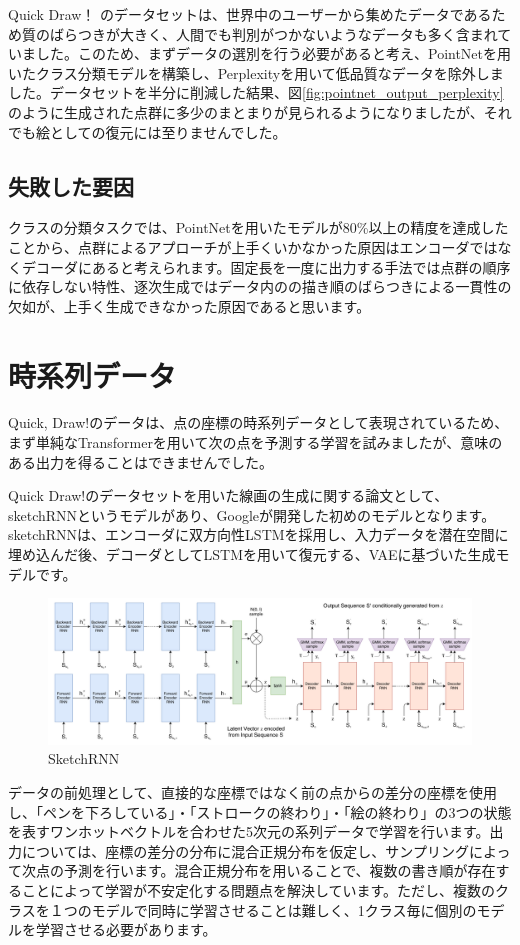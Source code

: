 Quick Draw！\cite{quickdraw} のデータセットは、世界中のユーザーから集めたデータであるため質のばらつきが大きく、人間でも判別がつかないようなデータも多く含まれていました。このため、まずデータの選別を行う必要があると考え、PointNet\cite{pointnet}を用いたクラス分類モデルを構築し、Perplexityを用いて低品質なデータを除外しました。データセットを半分に削減した結果、図\ref{fig:pointnet_output_perplexity}のように生成された点群に多少のまとまりが見られるようになりましたが、それでも絵としての復元には至りませんでした。

\subsection{失敗した要因}
クラスの分類タスクでは、PointNet\cite{pointnet}を用いたモデルが80\%以上の精度を達成したことから、点群によるアプローチが上手くいかなかった原因はエンコーダではなくデコーダにあると考えられます。固定長を一度に出力する手法では点群の順序に依存しない特性、逐次生成ではデータ内のの描き順のばらつきによる一貫性の欠如が、上手く生成できなかった原因であると思います。

\section{時系列データ}
Quick, Draw!\cite{quickdraw}のデータは、点の座標の時系列データとして表現されているため、まず単純なTransformerを用いて次の点を予測する学習を試みましたが、意味のある出力を得ることはできませんでした。

Quick Draw!\cite{quickdraw}のデータセットを用いた線画の生成に関する論文として、sketchRNN\cite{sketchRNN}というモデルがあり、Googleが開発した初めのモデルとなります。sketchRNN\cite{sketchRNN}は、エンコーダに双方向性LSTMを採用し、入力データを潜在空間に埋め込んだ後、デコーダとしてLSTMを用いて復元する、VAEに基づいた生成モデルです。
\begin{figure}[h]
  \centering
  \includegraphics[scale=0.45]{draw-forecast/fig/sketchrnn.png}
  \caption{SketchRNN}
  \label{fig:sketchrnn}
\end{figure}
データの前処理として、直接的な座標ではなく前の点からの差分の座標を使用し、「ペンを下ろしている」・「ストロークの終わり」・「絵の終わり」の3つの状態を表すワンホットベクトルを合わせた5次元の系列データで学習を行います。出力については、座標の差分の分布に混合正規分布を仮定し、サンプリングによって次点の予測を行います。混合正規分布を用いることで、複数の書き順が存在することによって学習が不安定化する問題点を解決しています。ただし、複数のクラスを１つのモデルで同時に学習させることは難しく、1クラス毎に個別のモデルを学習させる必要があります。

